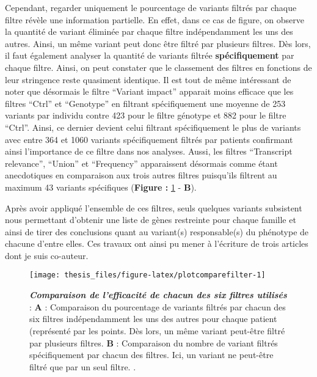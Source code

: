 \documentclass[12pt,twoside]{ugathesis}
\begin{document}
Cependant, regarder uniquement le pourcentage de variants filtrés par
chaque filtre révèle une information partielle. En effet, dans ce cas de
figure, on observe la quantité de variant éliminée par chaque filtre
indépendamment les uns des autres. Ainsi, un même variant peut donc être
filtré par plusieurs filtres. Dès lors, il faut également analyser la
quantité de variants filtrée \textbf{spécifiquement} par chaque filtre.
Ainsi, on peut constater que le classement des filtres en fonctions de
leur stringence reste quasiment identique. Il est tout de même
intéressant de noter que désormais le filtre ``Variant impact'' apparait
moins efficace que les filtres ``Ctrl'' et ``Genotype'' en filtrant
spécifiquement une moyenne de 253 variants par individu contre 423 pour
le filtre génotype et 882 pour le filtre ``Ctrl''. Ainsi, ce dernier
devient celui filtrant spécifiquement le plus de variants avec entre 364
et 1060 variants spécifiquement filtrés par patients confirmant ainsi
l'importance de ce filtre dans nos analyses. Aussi, les filtres
``Transcript relevance'', ``Union'' et ``Frequency'' apparaissent
désormais comme étant anecdotiques en comparaison aux trois autres
filtres puisqu'ils filtrent au maximum 43 variants spécifiques
(\textbf{Figure :} \ref{fig:plotcomparefilter} - \textbf{B}).

Après avoir appliqué l'ensemble de ces filtres, seuls quelques variants
subsistent nous permettant d'obtenir une liste de gènes restreinte pour
chaque famille et ainsi de tirer des conclusions quant au variant(s)
responsable(s) du phénotype de chacune d'entre elles. Ces travaux ont
ainsi pu mener à l'écriture de trois articles dont je suis co-auteur.

\newpage

\begin{figure}

{\centering \texttt{[image: thesis\_files/figure-latex/plotcomparefilter-1]} 

}

\caption[Comparaison de l'efficacité de chacun des six filtres utilisés]{\textbf{\emph{Comparaison de l'efficacité de
chacun des six filtres utilisés}} : \textbf{A} : Comparaison du
pourcentage de variants filtrés par chacun des six filtres
indépendamment les uns des autres pour chaque patient (représenté par
les points. Dès lors, un même variant peut-être filtré par plusieurs
filtres. \textbf{B} : Comparaison du nombre de variant filtrés
spécifiquement par chacun des filtres. Ici, un variant ne peut-être
filtré que par un seul filtre. .}\label{fig:plotcomparefilter}
\end{figure}
\end{document}

